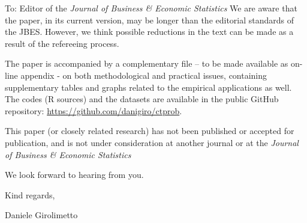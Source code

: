 \documentclass[11pt,a4paper]{letter}
\begin{document}
\begin{letter}{To: Editor of the \textit{Journal of Business \& Economic Statistics}}
We are aware that the paper, in its current version, may be longer than the editorial standards of the JBES. However, we think possible reductions in the text can be made as a result of the refereeing process. 

The paper is accompanied by a complementary file – to be made available as on-line appendix - on both methodological and practical issues, containing supplementary tables and graphs related to the empirical applications as well. The codes (R sources) and the datasets are available in the public GitHub repository: \url{https://github.com/danigiro/ctprob}.

This paper (or closely related research) has not been published or accepted for publication, and is not under consideration at another journal or at the \textit{Journal of Business \& Economic Statistics}

We look forward to hearing from you.

Kind regards,

Daniele Girolimetto

 \end{letter}
\end{document}
